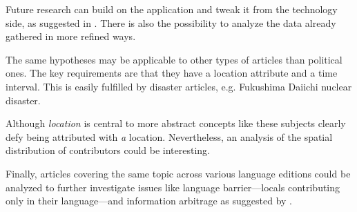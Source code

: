 %
Future research can build on the application and tweak it from the technology side, as suggested in .
There is also the possibility to analyze the data already gathered in more refined ways.

The same hypotheses may be applicable to other types of articles than political ones.
The key requirements are that they have a location attribute and a time interval.
This is easily fulfilled by disaster articles, e.g. Fukushima Daiichi nuclear disaster.

Although \emph{location} is central to more abstract concepts like  these subjects clearly defy being attributed with \emph{a} location.
Nevertheless, an analysis of the spatial distribution of contributors could be interesting. 

Finally, articles covering the same topic across various language editions could be analyzed to further investigate issues like language barrier---locals contributing only in their language---and information arbitrage as suggested by \textcite{adar2009information}.


